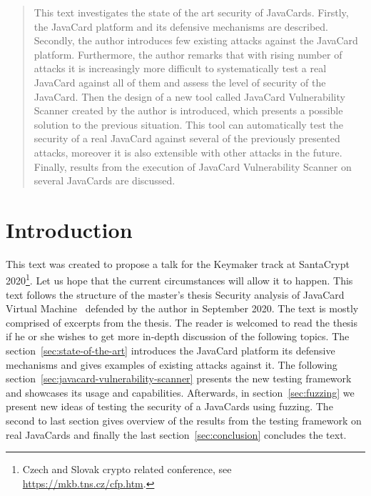 \documentclass{../llncs/llncs}
\begin{document}
\maketitle

\begin{abstract}
This text investigates the state of the art security of JavaCards. Firstly, the JavaCard platform and its defensive mechanisms are described. Secondly, the author introduces few existing attacks against the JavaCard platform. Furthermore, the author remarks that with rising number of attacks it is increasingly more difficult to systematically test a real JavaCard against all of them and assess the level of security of the JavaCard. Then the design of a new tool called JavaCard Vulnerability Scanner created by the author is introduced, which presents a possible solution to the previous situation. This tool can automatically test the security of a real JavaCard against several of the previously presented attacks, moreover it is also extensible with other attacks in the future. Finally, results from the execution of JavaCard Vulnerability Scanner on several JavaCards are discussed.
\end{abstract}



\section{Introduction}

This text was created to propose a talk for the Keymaker track at SantaCrypt 2020\footnote{Czech and Slovak crypto related conference, see \url{https://mkb.tns.cz/cfp.htm}.}. Let us hope that the current circumstances will allow it to happen. This text follows the structure of the master's thesis Security analysis of JavaCard Virtual Machine~\cite{Kvapil2020thesis} defended by the author in September 2020. The text is mostly comprised of excerpts from the thesis. The reader is welcomed to read the thesis if he or she wishes to get more in-depth discussion of the following topics.
The section~\ref{sec:state-of-the-art} introduces the JavaCard platform its defensive mechanisms and gives examples of existing attacks against it. The following section~\ref{sec:javacard-vulnerability-scanner} presents the new testing framework \projectname and showcases its usage and capabilities. Afterwards, in section~\ref{sec:fuzzing} we present new ideas of testing the security of a JavaCards using fuzzing. The second to last section gives overview of the results from the testing framework on real JavaCards and finally the last section~\ref{sec:conclusion} concludes the text.
\end{document}

